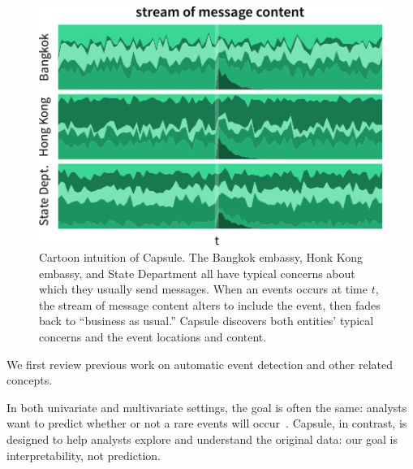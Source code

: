 \begin{figure}
\centering
\includegraphics[width=\linewidth]{fig/cartoon.pdf}
\caption{Cartoon intuition of Capsule.  The Bangkok embassy, Honk Kong embassy, and State Department all have typical concerns about which they usually send messages.  When an events occurs at time $t$, the stream of message content alters to include the event, then fades back to ``business as usual.''  Capsule discovers both entities' typical concerns and the event locations and content.}
\label{fig:cartoon}
\end{figure}



  We first review previous work on automatic event detection and other related concepts.  

In both univariate and multivariate settings, the goal is often the same: analysts want to predict whether or not a rare events will occur~\cite{weiss1998learning,das2008anomaly}.  Capsule, in contrast, is designed to help analysts explore and understand the original data: our goal is interpretability, not prediction.

